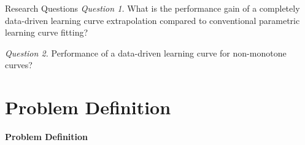 \documentclass[aspectratio=169]{beamer}
\newcommand{\pr}{\color{Pink}\huge{\textbf{Problem Definition}}}
\begin{document}
\begin{frame}{Research Questions}
  \centering
  \color{Pink} \textit{Question 1.} \color{Black} What is the performance gain of a completely data-driven learning curve extrapolation compared to conventional parametric learning curve fitting? 

  \vspace{1cm} 

  \color{Pink} \textit{Question 2.} \color{Black} Performance of a data-driven learning curve for non-monotone curves?
\end{frame}

\section{Problem Definition}
\begin{frame}
	\centering
	\pr
\end{frame}
\end{document}
